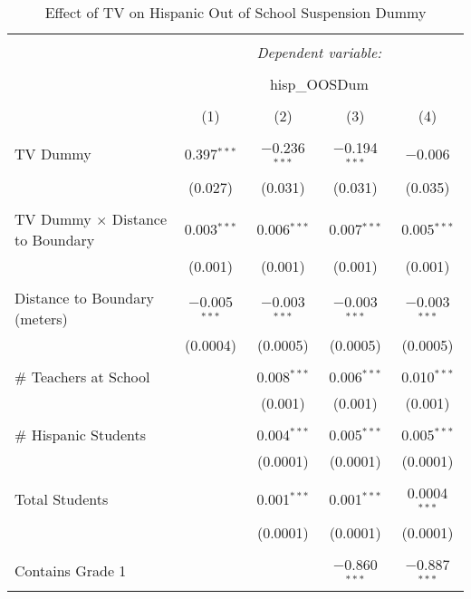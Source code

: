 
\begin{table}[!htbp] \centering 
  \caption{Effect of TV on Hispanic Out of School Suspension Dummy} 
  \label{} 
\begin{tabular}{@{\extracolsep{-2pt}}lcccc} 
\\[-1.8ex]\hline 
\hline \\[-1.8ex] 
 & \multicolumn{4}{c}{\textit{Dependent variable:}} \\ 
\cline{2-5} 
\\[-1.8ex] & \multicolumn{4}{c}{hisp\_OOSDum} \\ 
\\[-1.8ex] & (1) & (2) & (3) & (4)\\ 
\hline \\[-1.8ex] 
 TV Dummy & 0.397$^{***}$ & $-$0.236$^{***}$ & $-$0.194$^{***}$ & $-$0.006 \\ 
  & (0.027) & (0.031) & (0.031) & (0.035) \\ 
  & & & & \\ 
 TV Dummy $\times$ Distance to Boundary & 0.003$^{***}$ & 0.006$^{***}$ & 0.007$^{***}$ & 0.005$^{***}$ \\ 
  & (0.001) & (0.001) & (0.001) & (0.001) \\ 
  & & & & \\ 
 Distance to Boundary (meters) & $-$0.005$^{***}$ & $-$0.003$^{***}$ & $-$0.003$^{***}$ & $-$0.003$^{***}$ \\ 
  & (0.0004) & (0.0005) & (0.0005) & (0.0005) \\ 
  & & & & \\ 
 \# Teachers at School &  & 0.008$^{***}$ & 0.006$^{***}$ & 0.010$^{***}$ \\ 
  &  & (0.001) & (0.001) & (0.001) \\ 
  & & & & \\ 
 \# Hispanic Students &  & 0.004$^{***}$ & 0.005$^{***}$ & 0.005$^{***}$ \\ 
  &  & (0.0001) & (0.0001) & (0.0001) \\ 
  & & & & \\ 
 Total Students &  & 0.001$^{***}$ & 0.001$^{***}$ & 0.0004$^{***}$ \\ 
  &  & (0.0001) & (0.0001) & (0.0001) \\ 
  & & & & \\ 
 Contains Grade 1 &  &  & $-$0.860$^{***}$ & $-$0.887$^{***}$ \\ 

\end{tabular}
\end{table}
